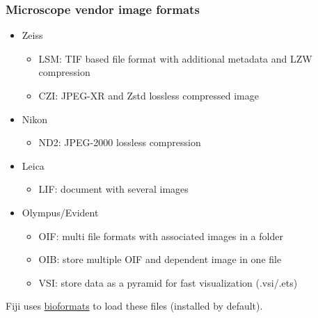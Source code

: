 \documentclass[ignorenonframetext,aspectratio=169,10pt,xcolor=table]{beamer}
\begin{document}
\begin{frame} \frametitle{Microscope vendor image formats}

  \begin{itemize}
    \item Zeiss
      \begin{itemize} \setlength\itemsep{1em}
      \item LSM: TIF based file format with additional metadata and LZW
        compression
      \item CZI: JPEG-XR and Zstd lossless compressed image
      \end{itemize}
    \item Nikon
      \begin{itemize}
        \item ND2: JPEG-2000 lossless compression
      \end{itemize}
    \item Leica
      \begin{itemize}
        \item LIF: document with several images
      \end{itemize}
    \item Olympus/Evident
      \begin{itemize}
        \item OIF: multi file formats with associated images in a folder
        \item OIB: store multiple OIF and dependent image in one file
        \item VSI: store data as a pyramid for fast visualization (.vsi/.ets)
      \end{itemize}
  \end{itemize}

  Fiji uses \href{https://imagej.net/formats/bio-formats}{bioformats} to load these files (installed by default).

\end{frame}
\end{document}
